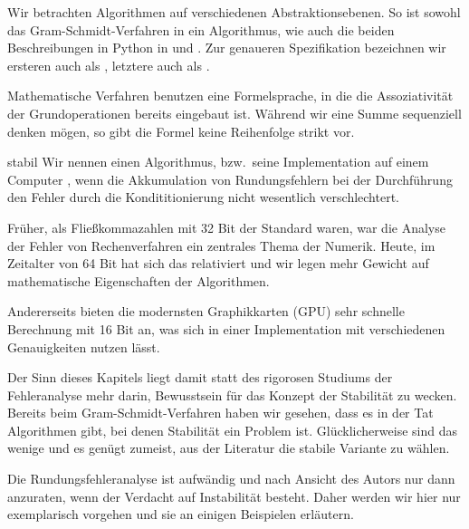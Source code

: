 \begin{remark}
  Wir betrachten Algorithmen auf verschiedenen Abstraktionsebenen. So
  ist sowohl das Gram-Schmidt-Verfahren in
   ein Algorithmus, wie auch die
  beiden Beschreibungen in Python in
   und
  . Zur genaueren Spezifikation bezeichnen
  wir ersteren auch als , letztere
  auch als .
\end{remark}

\begin{remark}
  Mathematische Verfahren benutzen eine Formelsprache, in die die
  Assoziativität der Grundoperationen bereits eingebaut ist. Während
  wir eine Summe sequenziell denken mögen, so gibt die Formel keine
  Reihenfolge strikt vor.
\end{remark}

\begin{Definition}{stabil}
  Wir nennen einen Algorithmus, bzw.\ seine Implementation auf einem
  Computer , wenn die Akkumulation von Rundungsfehlern
  bei der Durchführung den Fehler durch die Kondititionierung nicht
  wesentlich verschlechtert.
\end{Definition}

\begin{remark}
  Früher, als Fließkommazahlen mit 32 Bit der Standard waren, war die
  Analyse der Fehler von Rechenverfahren ein zentrales Thema der
  Numerik. Heute, im Zeitalter von 64 Bit hat sich das relativiert und
  wir legen mehr Gewicht auf mathematische Eigenschaften der Algorithmen.

  Andererseits bieten die modernsten Graphikkarten (GPU) sehr schnelle
  Berechnung mit 16 Bit an, was sich in einer Implementation mit
  verschiedenen Genauigkeiten nutzen lässt.

  Der Sinn dieses Kapitels liegt damit statt des rigorosen Studiums
  der Fehleranalyse mehr darin, Bewusstsein für das Konzept der
  Stabilität zu wecken. Bereits beim Gram-Schmidt-Verfahren haben wir
  gesehen, dass es in der Tat Algorithmen gibt, bei denen Stabilität
  ein Problem ist. Glücklicherweise sind das wenige und es genügt
  zumeist, aus der Literatur die stabile Variante zu wählen.

  Die Rundungsfehleranalyse ist aufwändig und nach Ansicht des Autors
  nur dann anzuraten, wenn der Verdacht auf Instabilität
  besteht. Daher werden wir hier nur exemplarisch vorgehen und sie an
  einigen Beispielen erläutern.
\end{remark}

